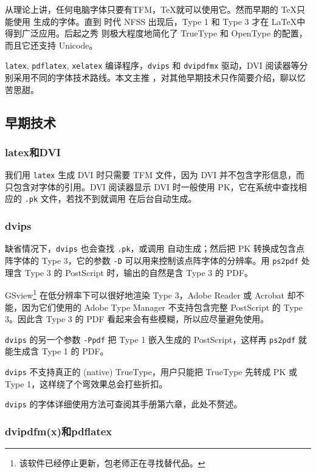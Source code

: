 从理论上讲，任何电脑字体只要有TFM，\TeX 就可以使用它。然而早期的 \TeX 只能使用 \MF 生成的字体。直到 \LaTeXe 时代 NFSS 出现后，Type 1 和 Type 3 才在 \LaTeX 中得到广泛应用。后起之秀 \XeTeX 则极大程度地简化了 TrueType 和 OpenType 的配置，而且它还支持 Unicode。

\texttt{latex}, \texttt{pdflatex}, \texttt{xelatex} 编译程序，\texttt{dvips} 和 \texttt{dvipdfmx} 驱动，DVI 阅读器等分别采用不同的字体技术路线。本文主推 \XeLaTeX ，对其他早期技术只作简要介绍，聊以忆苦思甜。

\subsection{早期技术}

\subsubsection{latex和DVI}

我们用 \texttt{latex} 生成 DVI 时只需要 TFM 文件，因为 DVI 并不包含字形信息，而只包含对字体的引用。DVI 阅读器显示 DVI 时一般使用 PK，它在系统中查找相应的 \texttt{.pk} 文件，若找不到就调用 \MF 在后台自动生成。

\subsubsection{dvips}

缺省情况下，\texttt{dvips} 也会查找 \texttt{.pk}，或调用 \MF 自动生成；然后把 PK 转换成包含点阵字体的 Type 3，它的参数 \texttt{-D} 可以用来控制该点阵字体的分辨率。用 \texttt{ps2pdf} 处理含 Type 3 的 PostScript 时，输出的自然是含 Type 3 的 PDF。

GSview\footnote{该软件已经停止更新，包老师正在寻找替代品。} 在低分辨率下可以很好地渲染 Type 3，Adobe Reader 或 Acrobat 却不能，因为它们使用的 Adobe Type Manager 不支持包含完整 PostScript 的 Type 3。因此含 Type 3 的 PDF 看起来会有些模糊，所以应尽量避免使用。

\texttt{dvips} 的另一个参数 \texttt{-Ppdf} 把 Type 1 嵌入生成的 PostScript，这样再 \texttt{ps2pdf} 就能生成含 Type 1 的 PDF。

\texttt{dvips} 不支持真正的 (native) TrueType，用户只能把 TrueType 先转成 PK 或 Type 1，这样绕了个弯效果总会打些折扣。

\texttt{dvips} 的字体详细使用方法可查阅其手册\citep{Rokicki_dvips}第六章，此处不赘述。

\subsubsection{dvipdfm(x)和pdflatex}

